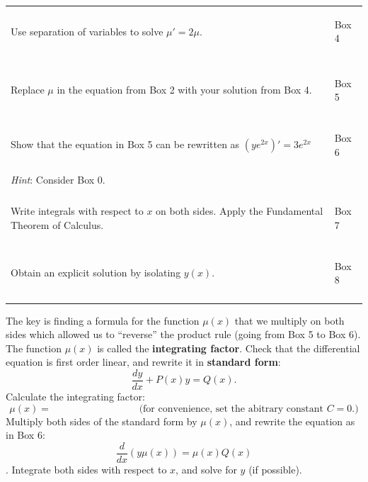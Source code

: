 \begin{enumerate}[resume]
\clearpage

\begin{center} \renewcommand{\arraystretch}{1.5}
\begin{tabular}{|p{2.5in}|V|}
\hline
Use separation of variables to solve $\mu' = 2\mu$.   & \begin{flushright}{\footnotesize Box 4}\end{flushright} \\
{} & {} \\ 
{} & {} \\ 
\hline
Replace $\mu$ in the equation from Box 2 with your solution from Box 4. & \begin{flushright}{\footnotesize Box 5}\end{flushright} \\
{} & {} \\ 
\hline
Show that the equation in Box 5 can be rewritten as $\left(ye^{2x}\right)' = 3e^{2x}$ & \begin{flushright}{\footnotesize Box 6}\end{flushright} \\
{\em Hint}: Consider Box 0. & {} \\ 
{} & {} \\ 
\hline
Write integrals with respect to $x$ on both sides.  Apply the Fundamental Theorem of Calculus. & \begin{flushright}{\footnotesize Box 7}\end{flushright} \\
{} & {} \\ 
\hline
Obtain an explicit solution by isolating $y(x)$.& \begin{flushright}{\footnotesize Box 8}\end{flushright} \\
{} & {}\\
\hline
\end{tabular}
\end{center}

The key is finding a formula for the function $\mu(x)$ that we multiply on both sides which allowed us to ``reverse'' the product rule (going from Box 5 to Box 6). The function $\mu(x)$ is called the \textbf{integrating factor}. 
\bi
\ii Check that the differential equation is first order linear, and rewrite it in \textbf{standard form}:
\[ \frac{dy}{dx} + P(x)y = Q(x).\]
\ii Calculate the integrating factor: \vs
\[ \mu(x) = \ \ \ \ \ \ \ \ \ \ \ \ \ \ \ \ \ \ \ \ \ \ \ \ \ \ \ \ \ \ \ \ \ \ \ \ \ \ \ \ \mbox{(for convenience, set the abitrary constant $C=0$.)} \]
\ii Multiply both sides of the standard form by $\mu(x)$, and rewrite the equation as in Box 6:
\[ \frac{d}{dx} \left(y \mu(x) \right) = \mu(x) Q(x)\].
\ii Integrate both sides with respect to $x$, and solve for $y$ (if possible).
\ei


\end{enumerate}
